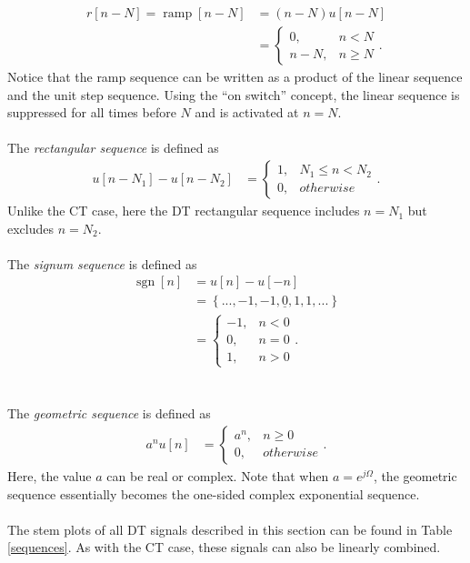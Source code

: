 \documentclass{report}
\begin{document}
\begin{align}
    r[n-N] = \operatorname{ramp}[n-N] &= (n-N)u[n-N] \\
    & =
    \begin{cases} 
        0, & n<N \\
        n-N, & n\geq N
    \end{cases}.
\end{align}
Notice that the ramp sequence can be written as a product of the linear sequence and the unit step sequence. Using the ``on switch'' concept, the linear sequence is suppressed 
for all times before $N$ and is activated at $n=N$.
\\ \\
The \emph{rectangular sequence} is defined as 
\begin{align}
    u[n-N_1] - u[n-N_2]
    &=
    \begin{cases} 
        1, & N_1 \leq n < N_2 \\
        0, & otherwise
    \end{cases}.
\end{align}
Unlike the CT case, here the DT rectangular sequence includes $n=N_1$ but excludes $n=N_2$.
\\ \\
The \emph{signum sequence} is defined as 
\begin{align}
    \operatorname{sgn}[n] &= u[n]-u[-n] \\ 
    &= \left\{...,-1,-1,\underline{0},1,1,...\right\} \\
    &=
    \begin{cases} 
        -1, & n<0 \\
        0, & n=0 \\
        1, & n>0
    \end{cases}.
\end{align}
\\ \\
The \emph{geometric sequence} is defined as 
\begin{align}
    a^n u[n]
    &=
    \begin{cases} 
        a^n, & n\geq 0 \\
        0, & otherwise
    \end{cases}.
\end{align}
Here, the value $a$ can be real or complex. Note that when $a=e^{j\Omega}$, the geometric sequence essentially becomes the 
one-sided complex exponential sequence.
\\ \\ 
The stem plots of all DT signals described in this section can be found in Table \ref{sequences}. As with the CT case, these signals 
can also be linearly combined.
\end{document}
